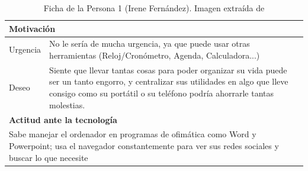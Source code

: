 \begin{table}[H]
\begin{tabular}{|l|l|l|}
		\hline
		\multicolumn{3}{|l|}{\cellcolor{lightblue}\textbf{Motivación}}                   \\ 
		\hline
		Urgencia     & \multicolumn{2}{l|}{
			\begin{minipage}[t]{0.7\textwidth}
				No le sería de mucha urgencia, ya que puede usar otras herramientas (Reloj/Cronómetro, Agenda, Calculadora...)
			\end{minipage}
		}                \\ 
		\hline
		Deseo        & \multicolumn{2}{l|}{
			\begin{minipage}[t]{0.7\textwidth}
				Siente que llevar tantas cosas para poder organizar su vida puede ser un tanto engorro, y centralizar sus utilidades en algo que lleve consigo como su portátil o su teléfono podría ahorrarle tantas molestias.
			\end{minipage}
		}                \\ 
		\hline
		\multicolumn{3}{|l|}{\cellcolor{lightblue}\textbf{Actitud ante la tecnología}}    \\ 
		\hline
		\multicolumn{3}{|l|}{
			\begin{minipage}[t]{\textwidth}
				Sabe manejar el ordenador en programas de ofimática como Word y Powerpoint; usa el navegador constantemente para ver sus redes sociales y buscar lo que necesite
			\end{minipage}
		}                              \\
		\hline
	\end{tabular}
	\caption[Ficha Persona 1]{Ficha de la Persona 1 (Irene Fernández). Imagen extraída de \cite{thispersondoesnotexist}}
\end{table}

\newpage

